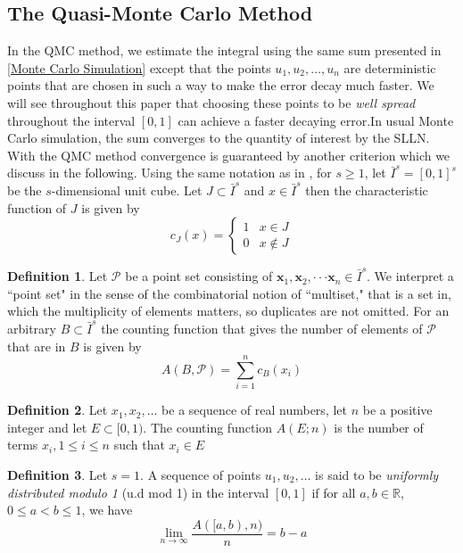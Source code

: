 \documentclass{article}
\theoremstyle{definition}
\newtheorem{definition}{Definition}[section]
\begin{document}
\subsection{The Quasi-Monte Carlo Method}
In the QMC method, we estimate the integral using the same sum presented in \eqref{Monte Carlo Simulation} except that the points \(u_1,u_2,\ldots,u_n\) are deterministic points that are chosen in such a way to make the error decay much faster. We will see throughout this paper that choosing these points to be \emph{well spread} throughout the interval \([0,1]\) can achieve  a faster decaying error.In usual Monte Carlo simulation, the sum converges to the quantity of interest by the SLLN. With the QMC method convergence is guaranteed by another criterion which we discuss in the following. Using the same notation as in \cite{NiederreiterHarald1992Rnga}, for \(s\geq 1\), let \(\bar{I}^{s}=[0,1]^s\) be the \(s\)-dimensional unit cube. Let  \(J\subset \bar{I}^{s}\) and \(x\in \bar{I}^{s}\) then the characteristic function of \(J\) is given by
\begin{equation}
    c_J(x) =
    \begin{cases}
        1 & x\in J \\
        0 & x\notin J
     \end{cases}
\end{equation}
\begin{definition}\label{counting finite}
Let \(\mathcal{P}\) be a point set consisting of $\mathbf{x}_1,\mathbf{x}_2,\cdot\cdot\cdot\mathbf{x}_n\in\bar{I}^{s} $.  We  interpret a
``point set" in the sense of the combinatorial notion of ``multiset," that is a set in, which the multiplicity of elements matters, so duplicates are not omitted. For an arbitrary \(B\subset\bar{I}^{s}\) the counting function that gives the number of elements of \(\mathcal{P}\) that are in $B$ is given by  
\begin{equation}
 A(B,\mathcal{P})=\sum_{i=1}^n c_B(x_i)
\end{equation}  
\end{definition}

\begin{definition}\label{counting infinite}
Let \(x_1,x_2,\ldots\) be a sequence of real numbers, let \(n\) be a positive integer and let \(E\subset [0,1)\). The counting function \(A(E;n)\) is the number of terms \(x_i,1\leq i\leq n\) such that \(x_i\in E\) 
\end{definition}

\begin{definition}\label{unifromly distributed} Let \(s=1\). A sequence of points \(u_1,u_2,\ldots\) is said to be \emph{uniformly distributed modulo 1} (u.d mod 1) in the interval \([0,1]\) if for all \(a,b\in\mathbb{R}\), \(0\leq a<b\leq1\), we have  
    \begin{equation}
        \lim_{n\to\infty}\frac{A([a,b),n)}{n}=b-a
    \end{equation}
\end{definition}
\end{document}
